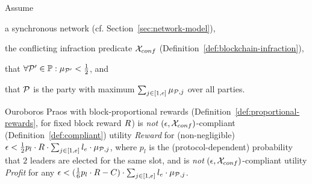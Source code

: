 \begin{theorem}\label{thm:compliant-praos}
    Assume
    \begin{inparaenum}[i)]
        \item a synchronous network (cf.
            Section~\ref{sec:network-model}),
        \item the conflicting infraction predicate $\mathcal{X}_{conf}$
            (Definition~\ref{def:blockchain-infraction}),
        \item that $\forall \mathcal{P}' \in \mathbb{P}: \mu_{\mathcal{P}'} <
            \frac{1}{2}$, and
        \item that $\mathcal{P}$ is the party with maximum $\sum_{j \in [1, e]} \mu_{\mathcal{P}, j}$ over all parties.
    \end{inparaenum}

    Ouroboros Praos with block-proportional rewards (Definition~\ref{def:proportional-rewards}, for fixed block reward $R$) is \emph{not} $(\epsilon, \mathcal{X}_{conf})$-compliant (Definition~\ref{def:compliant}) \wrt utility \emph{Reward} for (non-negligible)
    $\epsilon < \frac{1}{2} p_l \cdot R \cdot \sum_{j \in [1, e]} l_e \cdot \mu_{\mathcal{P},j}$,
    where $p_l$ is the (protocol-dependent) probability that $2$ leaders are
    elected for the same slot, and is \emph{not} $(\epsilon,
    \mathcal{X}_{conf})$-compliant \wrt utility \emph{Profit} for any
    $\epsilon < (\frac{1}{6} p_l \cdot R - C) \cdot \sum_{j \in [1, e]} l_e \cdot \mu_{\mathcal{P},j}$.
\end{theorem}
